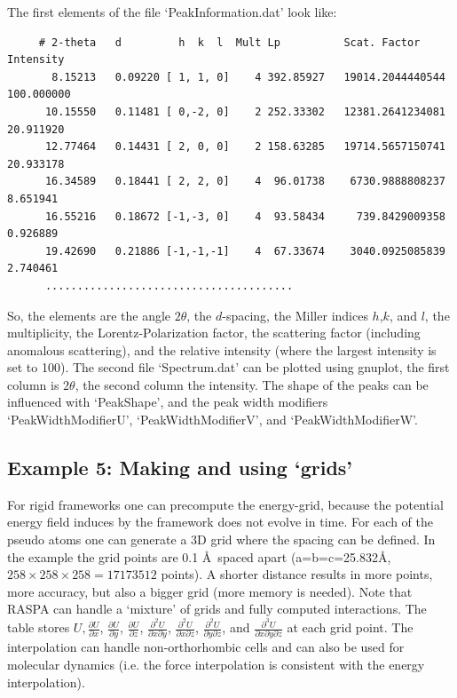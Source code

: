 The first elements of the file `PeakInformation.dat' look like:
\begin{tiny}
\begin{verbatim}
     # 2-theta   d         h  k  l  Mult Lp          Scat. Factor    Intensity
       8.15213   0.09220 [ 1, 1, 0]    4 392.85927   19014.2044440544   100.000000
      10.15550   0.11481 [ 0,-2, 0]    2 252.33302   12381.2641234081    20.911920
      12.77464   0.14431 [ 2, 0, 0]    2 158.63285   19714.5657150741    20.933178
      16.34589   0.18441 [ 2, 2, 0]    4  96.01738    6730.9888808237     8.651941
      16.55216   0.18672 [-1,-3, 0]    4  93.58434     739.8429009358     0.926889
      19.42690   0.21886 [-1,-1,-1]    4  67.33674    3040.0925085839     2.740461
      .......................................
\end{verbatim}
\end{tiny}
So, the elements are the angle $2\theta$, the $d$-spacing, the Miller indices $h$,$k$, and $l$, the multiplicity,
the Lorentz-Polarization factor, the scattering factor (including anomalous scattering), and the relative intensity (where
the largest intensity is set to 100).
The second file `Spectrum.dat' can be plotted using gnuplot, the first column is $2\theta$, the second column the intensity.
The shape of the peaks can be influenced with `PeakShape', and the peak width modifiers `PeakWidthModifierU',
`PeakWidthModifierV', and `PeakWidthModifierW'.

\subsection*{Example 5: Making and using `grids'}

For rigid frameworks one can precompute the energy-grid, because the potential energy field induces by the framework does
not evolve in time. For each of the pseudo atoms one can generate a 3D grid where the spacing can be defined. In the example
the grid points are 0.1 \AA\ spaced apart (a=b=c=25.832\AA, $258\times258\times258=17173512$ points). 
A shorter distance results in more points, more accuracy, but also a bigger
grid (more memory is needed). Note that RASPA can handle a `mixture' of grids and fully computed interactions.
The table stores $U,\frac{\partial U}{\partial x}$, $\frac{\partial U}{\partial y}$, $\frac{\partial U}{\partial z}$,
$\frac{\partial^2 U}{\partial x\partial y}$, $\frac{\partial^2 U}{\partial x\partial z}$, $\frac{\partial^2 U}{\partial y\partial z}$,
and $\frac{\partial^3 U}{\partial x\partial y \partial z}$ at each grid point. The interpolation can handle non-orthorhombic cells
and can also be used for molecular dynamics (i.e. the force interpolation is consistent with the energy interpolation).

